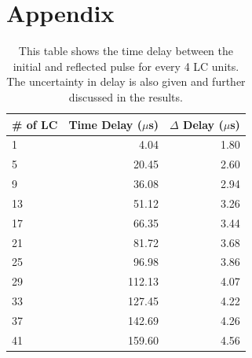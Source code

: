\documentclass[12pt]{article}
\begin{document}
\section{Appendix}
\begin{table}[h]
    \begin{tabular}{|l|r|r|}
    \hline

    \# of LC & \multicolumn{1}{l|}{Time Delay ($\mu$s)} & \multicolumn{1}{l|}{$\Delta$ Delay ($\mu$s)} \\ \hline
    1        & 4.04                                 & 1.80                                        \\ \hline
    5        & 20.45                                & 2.60                                        \\ \hline
    9        & 36.08                                & 2.94                                        \\ \hline
    13       & 51.12                                & 3.26                                        \\ \hline
    17       & 66.35                                & 3.44                                        \\ \hline
    21       & 81.72                                & 3.68                                        \\ \hline
    25       & 96.98                                & 3.86                                        \\ \hline
    29       & 112.13                               & 4.07                                        \\ \hline
    33       & 127.45                               & 4.22                                        \\ \hline
    37       & 142.69                               & 4.26                                        \\ \hline
    41       & 159.60                               & 4.56                                        \\ \hline
    \end{tabular}
    \centering
    \label{Tab:part1}
    \caption{This table shows the time delay between the initial and reflected pulse for every 4 LC units. The uncertainty in delay is also given and further discussed in the results.}
\end{table}
\end{document}
